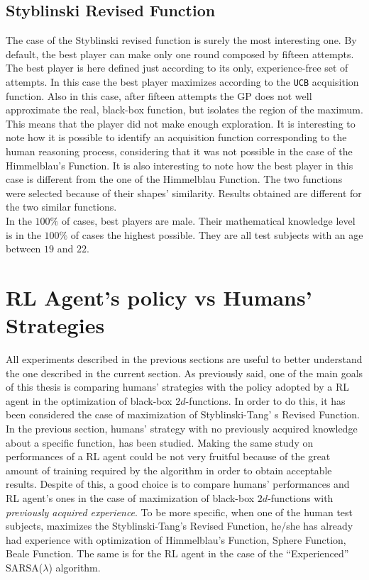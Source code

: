 \subsection{Styblinski Revised Function}
The case of the Styblinski revised function is surely the most interesting one. By default, the best player can make only one round composed by fifteen attempts. The best player is here defined just according to its only, experience-free set of attempts. In this case the best player maximizes according to the {\tt UCB} acquisition function. Also in this case, after fifteen attempts the GP does not well approximate the real, black-box function, but isolates the region of the maximum. This means that the player did not make enough exploration. It is interesting to note how it is possible to identify an acquisition function corresponding to the human reasoning process, considering that it was not possible in the case of the Himmelblau's Function. It is also interesting to note how the best player in this case is different from the one of the Himmelblau Function. The two functions were selected because of their shapes' similarity. Results obtained are different for the two similar functions. \\

In the $100\%$ of cases, best players are male. Their mathematical knowledge level is in the $100\%$ of cases the highest possible. They are all test subjects with an age between $19$ and $22$.

\section{RL Agent's  policy vs Humans' Strategies}
All experiments described in the previous sections are useful to better understand the one described in the current section. As previously said, one of the main goals of this thesis is comparing humans' strategies with the policy adopted by a RL agent in the optimization of black-box $2d$-functions. In order to do this, it has been considered the case of maximization of Styblinski-Tang' s Revised Function. In the previous section, humans' strategy with no previously acquired knowledge about a specific function, has been studied. Making the same study on performances of a RL agent could be not very fruitful because of the great amount of training required by the algorithm in order to obtain acceptable results. Despite of this, a good choice is to compare humans' performances and RL agent's ones in the case of maximization of black-box $2d$-functions with \textit{previously acquired experience}. To be more specific, when one of the human test subjects, maximizes the Styblinski-Tang's Revised Function, he/she has already had experience with optimization of Himmelblau's Function, Sphere Function, Beale Function. The same is for the RL agent in the case of the \enquote{Experienced} SARSA($\lambda$) algorithm.

